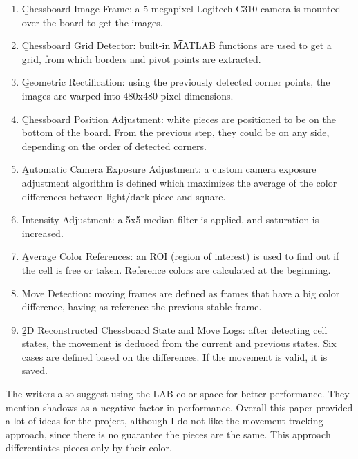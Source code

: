 \begin{enumerate}
    \item \b{Chessboard Image Frame}: a 5-megapixel Logitech C310 camera is mounted over the board to get the images.
    
    \item \b{Chessboard Grid Detector}: built-in \t{MATLAB} functions are used to get a grid, from which borders and pivot points are extracted.
    
    \item \b{Geometric Rectification}: using the previously detected corner points, the images are warped into 480x480 pixel dimensions.
    
    \item \b{Chessboard Position Adjustment}: white pieces are positioned to be on the bottom of the board. From the previous step, they could be on any side, depending on the order of detected corners.
    
    \item \b{Automatic Camera Exposure Adjustment}: a custom camera exposure adjustment algorithm is defined which \i{maximizes the average of the color differences between light/dark piece and square}.
    
    \item \b{Intensity Adjustment}: a 5x5 median filter is applied, and saturation is increased.
    
    \item \b{Average Color References}: an ROI (region of interest) is used to find out if the cell is free or taken. Reference colors are calculated at the beginning.
    
    \item \b{Move Detection}: moving frames are defined as frames that have a big color difference, having as reference the previous stable frame. 
    
    \item \b{2D Reconstructed Chessboard State and Move Logs}: after detecting cell states, the movement is deduced from the current and previous states. Six cases are defined based on the differences. If the movement is valid, it is saved.
\end{enumerate}
\vspace{0.5cm}

The writers also suggest using the LAB color space for better performance. They mention shadows as a negative factor in performance. Overall this paper provided a lot of ideas for the project, although I do not like the movement tracking approach, since there is no guarantee the pieces are the same. This approach differentiates pieces only by their color.


